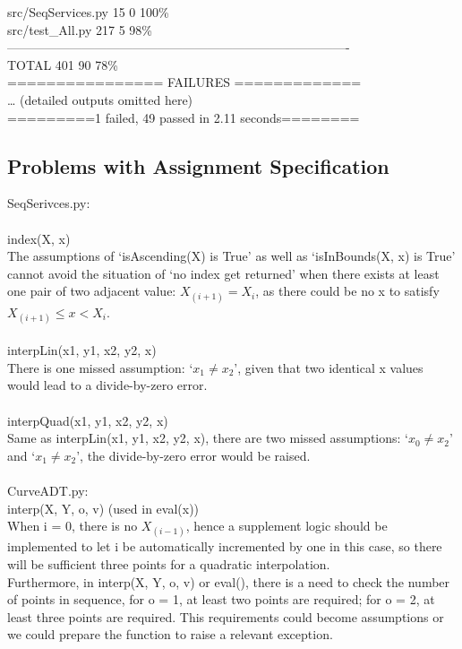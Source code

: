 \documentclass[12pt]{article}
\begin{document}
src/SeqServices.py   \hspace{17ex}           15\hspace{8ex}      0\hspace{4ex}      100\%\\
src/test\_All.py        \hspace{20ex}           217\hspace{7ex}      5 \hspace{4ex}     98\%\\
----------------------------------------------------------------------------------\\
TOTAL           \hspace{27ex}                   401 \hspace{5ex}    90  \hspace{3ex}   78\%\\
================ FAILURES =============\\
… (detailed outputs omitted here)\\
=========1 failed, 49 passed in 2.11 seconds========\\

\subsection{Problems with Assignment Specification}
\large SeqSerivces.py:\\
\\
\normalsize index(X, x)\\
The assumptions of ‘isAscending(X) is True’ as well as ‘isInBounds(X, x) is True’ cannot avoid the situation of ‘no index get returned’ when there exists at least one pair of two adjacent value: $X_{(i+1)}=X_i$, as there could be no x to satisfy $X_(i+1) \leq x<X_i$.\\
\\
	interpLin(x1, y1, x2, y2, x)\\
There is one missed assumption: ‘$x_1≠x_2$’, given that two identical x values would lead to a divide-by-zero error.\\
\\
	interpQuad(x1, y1, x2, y2, x)\\
Same as interpLin(x1, y1, x2, y2, x), there are two missed assumptions: ‘$x_0≠x_2$’ and ‘$x_1≠x_2$’, the divide-by-zero error would be raised.\\
\\
\large CurveADT.py:\\
\normalsize	interp(X, Y, o, v) (used in eval(x))\\
When i = 0, there is no $X_{(i-1)}$, hence a supplement logic should be implemented to let i be automatically incremented by one in this case, so there will be sufficient three points for a quadratic interpolation.\\
Furthermore, in interp(X, Y, o, v) or eval(), there is a need to check the number of points in sequence, for o = 1, at least two points are required; for o = 2, at least three points are required. This requirements could become assumptions or we could prepare the function to raise a relevant exception.
\end{document}
